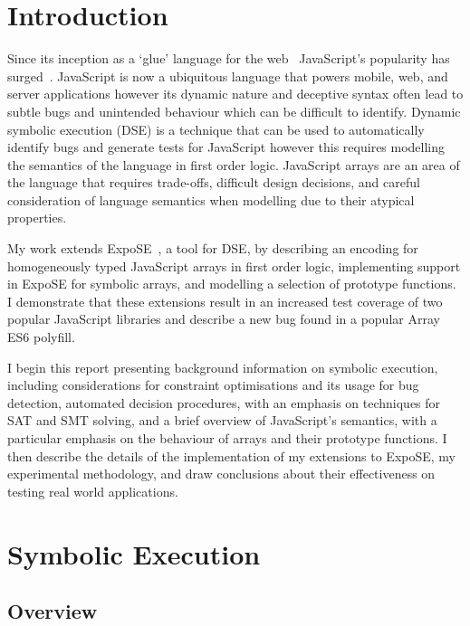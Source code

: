 \documentclass[]{final_report}
\begin{document}
\chapter{Introduction}
Since its inception as a `glue' language for the web~\cite{AZProgrammingLanguages} JavaScript's popularity has surged~\cite{stackoverflowsurvey,tiobeindex2017nov}. JavaScript is now a ubiquitous language that powers mobile, web, and server applications however its dynamic nature and deceptive syntax often lead to subtle bugs and unintended behaviour which can be difficult to identify. Dynamic symbolic execution (DSE) is a technique that can be used to automatically identify bugs and generate tests for JavaScript however this requires modelling the semantics of the language in first order logic. JavaScript arrays are an area of the language that requires trade-offs, difficult design decisions, and careful consideration of language semantics when modelling due to their atypical properties.

My work extends ExpoSE~\cite{DBLP:conf/spin/2017}, a tool for DSE, by describing an encoding for homogeneously typed JavaScript arrays in first order logic, implementing support in ExpoSE for symbolic arrays, and modelling a selection of prototype functions. I demonstrate that these extensions result in an increased test coverage of two popular JavaScript libraries and describe a new bug found in a popular Array ES6 polyfill.

I begin this report presenting background information on symbolic execution, including considerations for constraint optimisations and its usage for bug detection, automated decision procedures, with an emphasis on techniques for SAT and SMT solving, and a brief overview of JavaScript's semantics, with a particular emphasis on the behaviour of arrays and their prototype functions. I then describe the details of the implementation of my extensions to ExpoSE, my experimental methodology, and draw conclusions about their effectiveness on testing real world applications.

\chapter{Symbolic Execution}

\section{Overview}
\end{document}
